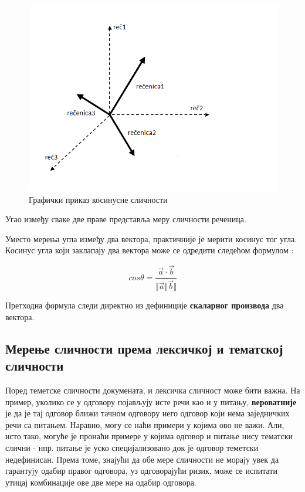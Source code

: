 \begin{figure}[H]
    \centering
   \includegraphics[scale=0.3]{./Slike/kosinusna.png} 
	\caption{Графички приказ косинусне сличности}
	\label{fig:slika1}
\end{figure}

Угао између сваке две праве представља меру сличности реченица.

Уместо мерења угла између два вектора, практичније је мерити косинус тог угла. 
Косинус угла који заклапају два вектора може се одредити следећом формулом :


$$ cos\theta = \frac{\overrightarrow{a}\cdot \overrightarrow{b}}{\Vert\overrightarrow{a}\Vert\overrightarrow{b}\Vert} $$

Претходна формула следи директно из дефиниције \textbf{скаларног производа} два вектора.


\subsection{Мерење сличности према лексичкој и тематској сличности}

Поред теметске сличности докумената, и лексичка сличност може бити важна. На пример, уколико се у одговору појављују исте речи као и у питању, \textbf{вероватније} је да је тај одговор ближи тачном одговору него одговор који нема заједничких речи са питањем. Наравно, могу се наћи примери у којима ово не важи. Али, исто тако, могуће је пронаћи примере у којима одговор и питање нису тематски слични - нпр. питање је уско специјализовано док је одговор теметски недефинисан. Према томе, знајући да обе мере сличности не морају увек да гарантују одабир правог одговора, уз одговорајући ризик, може се испитати утицај комбинације ове две мере на одабир одговора. 

